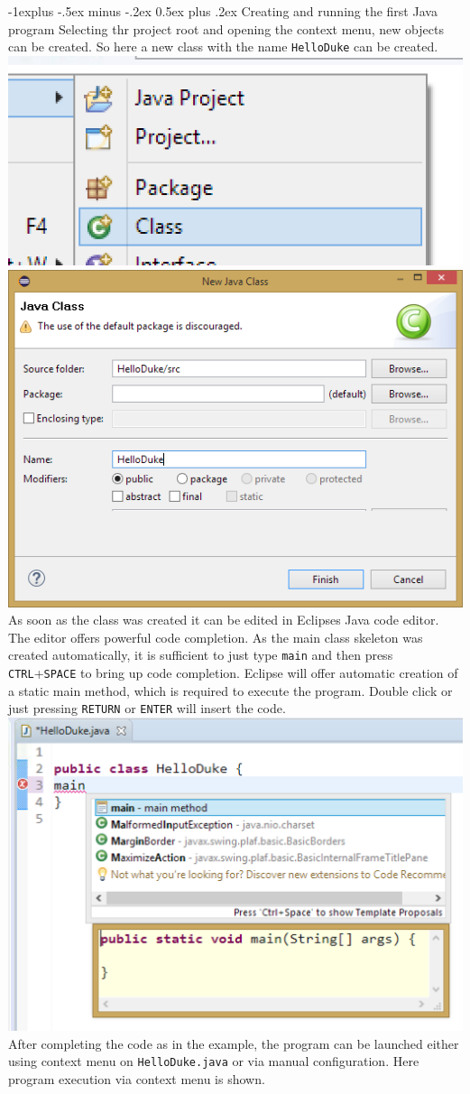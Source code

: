 \documentclass[10pt,landscape]{article}
\makeatletter
\renewcommand{\subsection}{\@startsection{subsection}{2}{0mm}%
                                {-1explus -.5ex minus -.2ex}%
                                {0.5ex plus .2ex}%
                                {\normalfont\normalsize\bfseries}}
\makeatother
\begin{document}
\begin{multicols}{2}
\subsection{Creating and running the first Java program}
Selecting thr project root and opening the context menu, new objects can be created. So here a new class with the name \texttt{HelloDuke} can be created.\\
\includegraphics[width=.3\linewidth]{../slides/ContextMenu_CreateClass.png} 
\includegraphics[width=.5\linewidth]{../slides/EclipseProjectExplorerNewClass2.png}\\
As soon as the class was created it can be edited in Eclipses Java code editor. The editor offers powerful code completion. As the main class skeleton was created automatically, it is sufficient to just type \texttt{main} and then press \texttt{CTRL}+\texttt{SPACE} to bring up code completion. Eclipse will offer automatic creation of a static main method, which is required to execute the program. Double click or just pressing \texttt{RETURN} or \texttt{ENTER} will insert the code.\\
\includegraphics[width=.6\linewidth]{../slides/CodeCompletion_MainMethod.png}\\
After completing the code as in the example, the program can be launched either using context menu on \texttt{HelloDuke.java} or via manual configuration. Here program execution via context menu is shown.\\

\end{multicols}
\end{document}
